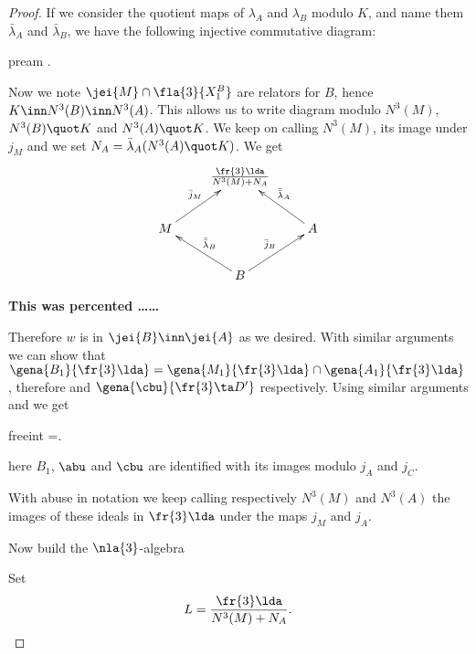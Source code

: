 \begin{proof}
If we consider the quotient maps of $\lambda_{A}$ and $\lambda_{B}$ modulo $K$, and name them
$\bar\lambda_{A}$ and $\bar\lambda_{B}$, we have the following injective commutative diagram:
\begin{labeq}{pream}
.\end{labeq}
Now %
we note $\jei{M}\cap\fla{3}{X_{1}^{B}}$ are relators for $B$, hence $K\inn N^{3}(B)\inn N^{3}(A)$.
This allows us to write diagram  modulo $N^{3}(M)$, $N^{3}(B)\quot K$ and $N^{3}(A)\quot K$.
We keep on calling $N^{3}(M)$, its image under $j_{M}$ and we set $N_{A}=\bar\lambda_{A}(N^{3}(A)\quot K)$.
We get
$$
\xymatrix{
&\frac{\fr{3}\lda}{N^{3}(M)+N_{A}}&\\
{M}\ar[ur]^{\bar j_{M}}&&{A}\ar[ul]_{\bar{\bar\lambda}_{A}}\\
&{B}\ar[ul]_{\bar{\bar\lambda}_{B}}\ar[ur]^{\bar j_{B}}&}
$$

{\bf This was percented \dots\dots }
\begin{flushright}
Therefore $w$ is in $\jei{B}\inn\jei{A}$ as we desired.
With similar arguments we can show that
$\gena{B_{1}}{\fr{3}\lda}=\gena{M_{1}}{\fr{3}\lda}\cap\gena{A_{1}}{\fr{3}\lda}$,
therefore
and $\gena{\cbu}{\fr{3}\ta D^{\prime}}$ respectively.
\bigskip
Using similar arguments and 
we get
\begin{labeq}{freeint}
=\cap{}.
\end{labeq}
here $B_{1}$, $\abu$ and $\cbu$ are identified with its images modulo $j_{A}$ and $j_{C}$. 

With abuse in notation we keep calling respectively
$N^{3}(M)$ and $N^{3}(A)$ the images of these ideals in $\fr{3}\lda$ under the
maps $j_{M}$ and $j_{A}$.
\end{flushright}

Now build the $\nla{3}$-algebra

\bigskip
Set
$$L=\frac{\fr{3}\lda}{N^{3}(M)+N_{A}}.$$


\end{proof}
